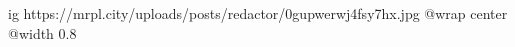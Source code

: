 
 
 
 
 

\ifcmt
  ig https://mrpl.city/uploads/posts/redactor/0gupwerwj4fsy7hx.jpg
  @wrap center
  @width 0.8
\fi
